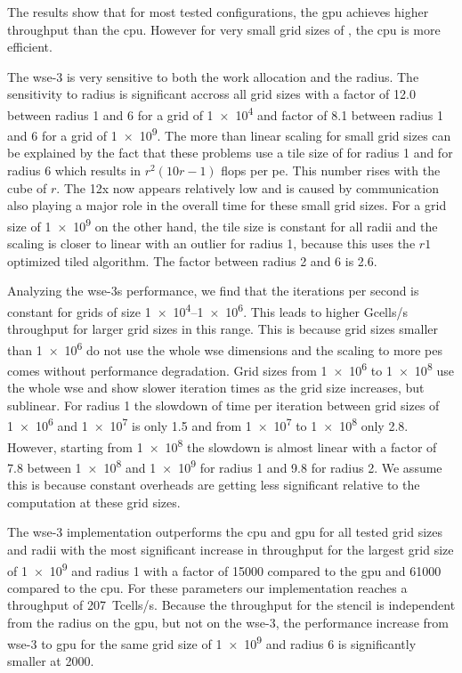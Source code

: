 The results show that for most tested configurations, the \ac{gpu} achieves higher throughput than the \ac{cpu}.
However for very small grid sizes of , the \ac{cpu} is more efficient.

The \ac{wse}-3 is very sensitive to both the work allocation and the radius. The sensitivity to radius is significant accross all grid sizes with a factor of \num{12.0} between radius \num{1} and \num{6} for a grid of \num{1e4} and factor of \num{8.1} between radius \num{1} and \num{6} for a grid of \num{1e9}.
The more than linear scaling for small grid sizes can be explained by the fact that these problems use a tile size of  for radius \num{1} and  for radius \num{6} which results in $r^2(10r-1)$ flops per \ac{pe}. This number rises with the cube of $r$. The 12x now appears relatively low and is caused by communication also playing a major role in the overall time for these small grid sizes. For a grid size of \num{1e9} on the other hand, the tile size is constant for all radii and the scaling is closer to linear with an outlier for radius \num{1}, because this uses the $r1$ optimized tiled algorithm. The factor between radius \num{2} and \num{6} is \num{2.6}.

Analyzing the \ac{wse}-3s performance, we find that the iterations per second is constant for grids of size \numrange{1e4}{1e6}. This leads to higher Gcells/s throughput for larger grid sizes in this range. This is because grid sizes smaller than \num{1e6} do not use the whole \ac{wse} dimensions and the scaling to more \acp{pe} comes without performance degradation. Grid sizes from \num{1e6} to \num{1e8} use the whole \ac{wse} and show slower iteration times as the grid size increases, but sublinear. For radius \num{1} the slowdown of time per iteration between grid sizes of \num{1e6} and \num{1e7} is only \num{1.5} and from \num{1e7} to \num{1e8} only \num{2.8}. However, starting from \num{1e8} the slowdown is almost linear with a factor of \num{7.8} between \num{1e8} and \num{1e9} for radius \num{1} and \num{9.8} for radius \num{2}. We assume this is because constant overheads are getting less significant relative to the computation at these grid sizes.

The \ac{wse}-3 implementation outperforms the \ac{cpu} and \ac{gpu} for all tested grid sizes and radii with the most significant increase in throughput for the largest grid size of \num{1e9} and radius \num{1} with a factor of \num{15000} compared to the \ac{gpu} and \num{61000} compared to the \ac{cpu}. For these parameters our implementation reaches a throughput of \qty{207}{\tera cells/s}. Because the throughput for the stencil is independent from the radius on the \ac{gpu}, but not on the \ac{wse}-3, the performance increase from \ac{wse}-3 to \ac{gpu} for the same grid size of \num{1e9} and radius \num{6} is significantly smaller at \num{2000}.


